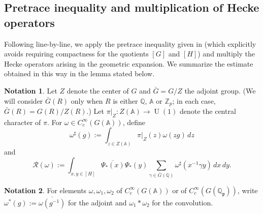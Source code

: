 \documentclass[reqno]{amsart}
\DeclareMathOperator{\U}{U}
\theoremstyle{plain} \newtheorem{theorem} {Theorem}
\theoremstyle{definition} \newtheorem{definition} [theorem] {Definition}
\newtheorem{notation} [theorem]        {Notation}
\theoremstyle{itplain} %
\numberwithin{equation}{section}
\numberwithin{theorem}{section}
\begin{document}
\subsection{Pretrace inequality and multiplication of Hecke operators}\label{sec:pretr-ineq-mult-1}
Following \cite[\S6.3]{2020arXiv201202187N} line-by-line, we apply the pretrace inequality given in \cite[Lemma 5.5]{2020arXiv201202187N} (which explicitly avoids requiring compactness for the quotients $[G]$ and $[H]$) and multiply the Hecke operators arising in the geometric expansion.  We summarize the estimate obtained in this way in the lemma stated below.
\begin{notation}
  Let $Z$ denote the center of $G$ and $\bar{G} = G/Z$ the adjoint group.  (We will consider $\bar{G}(R)$ only when $R$ is either $\mathbb{Q}$, $\mathbb{A}$ or $\mathbb{Z}_p$; in each case, $\bar{G}(R) = G(R) / Z(R)$.)  Let $\pi|_Z : Z(\mathbb{A}) \rightarrow \U(1)$ denote the central character of $\pi$.  For $\omega \in C_c^\infty(G(\mathbb{A}))$, define
  \begin{equation*}
    \omega^\sharp(g) := \int _{z \in Z(\mathbb{A})} \pi|_Z(z) \omega(z g) \, d z
  \end{equation*}
  and
  \begin{equation*}
    \mathcal{R}(\omega) := \int _{x, y \in [H]} \overline{\Psi_{\ast}(x)} \Psi_{\ast}(y)
    \sum _{\gamma \in \bar{G}(\mathbb{Q})} \omega^\sharp(x^{-1} \gamma y) \, d x \, d y.
  \end{equation*}
\end{notation}
\begin{notation}\label{notation:convolve-adjoint-local-global-pretrace}
  For elements $\omega, \omega_1, \omega_2$ of $C_c^\infty(G(\mathbb{A}))$ or of $C_c^\infty(G(\mathbb{Q}_\mathfrak{p}))$, write $\omega^*(g) := \overline{\omega(g^{-1})}$ for the adjoint and $\omega_1 \ast \omega_2$ for the convolution.
\end{notation}
\end{document}
